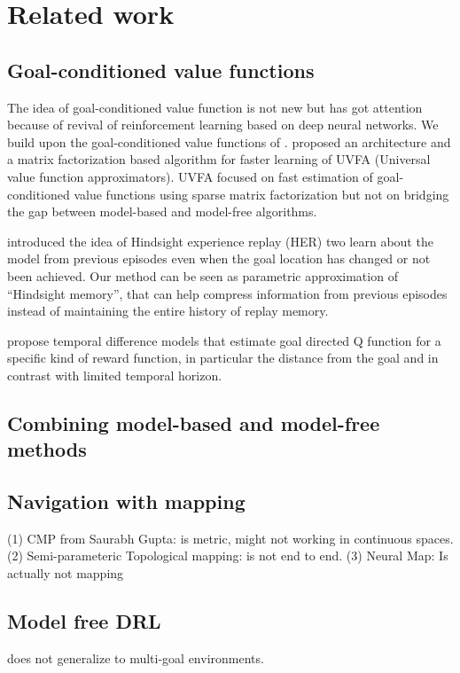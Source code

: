 \documentclass[letterpaper]{article} %
\begin{document}
\section{Related work}
\subsection{Goal-conditioned value functions}
The idea of goal-conditioned value function is not new but has got attention because of revival of reinforcement learning based on deep neural networks.
We build upon the goal-conditioned value functions of \citet{schaul2015universal}.
\citet{schaul2015universal} proposed an architecture and a matrix factorization based algorithm for faster learning of UVFA (Universal value function approximators).
UVFA focused on fast estimation of goal-conditioned value functions using sparse
matrix factorization but not on bridging the gap between model-based and model-free
algorithms.


\citet{andrychowicz2016learning} introduced the idea of Hindsight experience replay (HER) two learn about the model from previous episodes even when the goal location has changed or not been achieved.
Our method can be seen as parametric approximation of ``Hindsight memory'',
that can help compress information from previous episodes instead of maintaining the
entire history of replay memory.

\cite{pong2018temporal} propose temporal difference models that estimate goal directed Q function for a specific kind of reward function, in particular the distance from the goal and in contrast with limited temporal horizon.

\subsection{Combining model-based and model-free methods}




\subsection{Navigation with mapping}
 (1) CMP from Saurabh Gupta: is metric, might not working in continuous spaces.
 (2) Semi-parameteric Topological mapping: is not end to end.
 (3) Neural Map: Is actually not mapping

\subsection{Model free DRL }
does not generalize to multi-goal environments.
\end{document}

